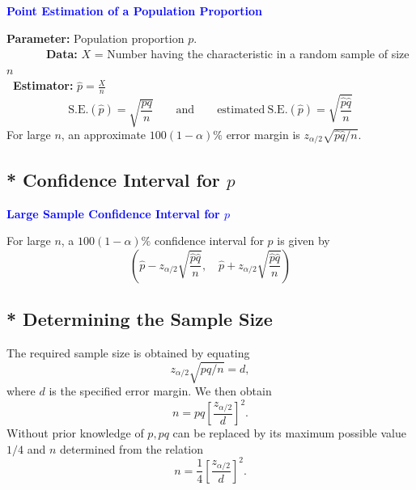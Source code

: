 \documentclass[12pt,a4paper]{article}
\newcommand{\dispsty}{\displaystyle}
\newcommand{\SE}{\text{S.E.}}
\begin{document}
\begin{tcolorbox}[colback=white]\begin{center}
		\textcolor{blue}{\bf Point Estimation of a Population Proportion}
	\end{center} 
	\textbf{Parameter:} Population proportion $p$. \\
	\ \ \ \ \ \  \ \textbf{Data:} $X$ = Number having the characteristic in a random sample of size $n$\\
	\textbf{\ Estimator:} $\hat{p}=\dispsty\frac{X}{n}$ \\
	\[
	\SE(\hat{p})=\sqrt{\frac{pq}{n}}\qquad\text{and}\qquad\text{estimated}\ \SE(\hat{p})=\sqrt{\frac{\hat{p}\hat{q}}{n}}
	\] For large $n$, an approximate $100(1-\alpha)\%$ error margin is $z_{\alpha/2}\sqrt{\hat{p}\hat{q}/n}$.
\end{tcolorbox}

\subsection*{* Confidence Interval for $p$}

\begin{tcolorbox}[colback=white]\begin{center}
		\textcolor{blue}{\bf Large Sample Confidence Interval for $p$}
	\end{center} For large $n$, a $100(1-\alpha)\%$ confidence interval for $p$ is given by \[
	\left(\hat{p}-z_{\alpha/2}\sqrt{\frac{\hat{p}\hat{q}}{n}},\quad \hat{p}+z_{\alpha/2}\sqrt{\frac{\hat{p}\hat{q}}{n}}\right)
\] 
\end{tcolorbox}

\subsection*{* Determining the Sample Size}
The required sample size is obtained by equating \[
z_{\alpha/2}\sqrt{pq/n}=d,
\] where $d$ is the specified error margin. We then obtain \[
n=pq\left[\frac{z_{\alpha/2}}{d}\right]^2.
\] Without prior knowledge of $p, pq$ can be replaced by its maximum possible value $1/4$ and $n$ determined from the relation \[
n=\frac{1}{4}\left[\frac{z_{\alpha/2}}{d}\right]^2.
\]
\end{document}
